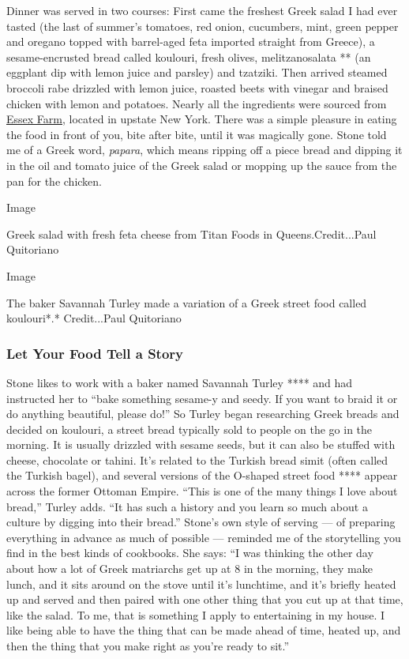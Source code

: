 Dinner was served in two courses: First came the freshest Greek salad I
had ever tasted (the last of summer's tomatoes, red onion, cucumbers,
mint, green pepper and oregano topped with barrel-aged feta imported
straight from Greece), a sesame-encrusted bread called koulouri, fresh
olives, melitzanosalata ** (an eggplant dip with lemon juice and
parsley) and tzatziki. Then arrived steamed broccoli rabe drizzled with
lemon juice, roasted beets with vinegar and braised chicken with lemon
and potatoes. Nearly all the ingredients were sourced from
\href{https://www.essexonlakechamplain.com/essex-farm/}{Essex Farm},
located in upstate New York. There was a simple pleasure in eating the
food in front of you, bite after bite, until it was magically gone.
Stone told me of a Greek word, \emph{papara}, which means ripping off a
piece bread and dipping it in the oil and tomato juice of the Greek
salad or mopping up the sauce from the pan for the chicken.

Image

Greek salad with fresh feta cheese from Titan Foods in
Queens.Credit...Paul Quitoriano

Image

The baker Savannah Turley made a variation of a Greek street food called
koulouri*.* Credit...Paul Quitoriano

\hypertarget{let-your-food-tell-a-story}{%
\subsubsection{Let Your Food Tell a
Story}\label{let-your-food-tell-a-story}}

Stone likes to work with a baker named Savannah Turley **** and had
instructed her to ``bake something sesame-y and seedy. If you want to
braid it or do anything beautiful, please do!'' So Turley began
researching Greek breads and decided on koulouri, a street bread
typically sold to people on the go in the morning. It is usually
drizzled with sesame seeds, but it can also be stuffed with cheese,
chocolate or tahini. It's related to the Turkish bread simit (often
called the Turkish bagel), and several versions of the O-shaped street
food **** appear across the former Ottoman Empire. ``This is one of the
many things I love about bread,'' Turley adds. ``It has such a history
and you learn so much about a culture by digging into their bread.''
Stone's own style of serving --- of preparing everything in advance as
much of possible --- reminded me of the storytelling you find in the
best kinds of cookbooks. She says: ``I was thinking the other day about
how a lot of Greek matriarchs get up at 8 in the morning, they make
lunch, and it sits around on the stove until it's lunchtime, and it's
briefly heated up and served and then paired with one other thing that
you cut up at that time, like the salad. To me, that is something I
apply to entertaining in my house. I like being able to have the thing
that can be made ahead of time, heated up, and then the thing that you
make right as you're ready to sit.''

